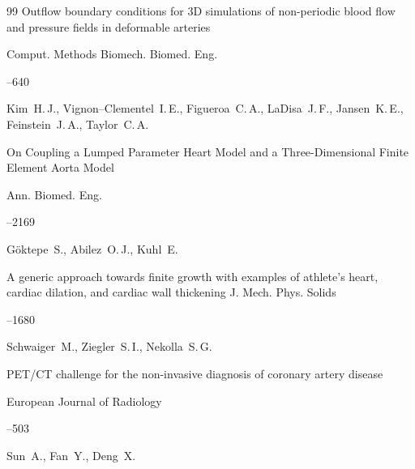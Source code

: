 \begin{thebibliography}{99}
\paper Outflow boundary conditions for 3D simulations of non-periodic blood flow and pressure fields in deformable arteries

\jour Comput. Methods Biomech. Biomed. Eng.




--640








\by Kim~H.\,J., Vignon--Clementel~I.\,E., Figueroa~C.\,A., LaDisa~J.\,F., Jansen~K.\,E., Feinstein~J.\,A., Taylor~C.\,A.

\paper On Coupling a Lumped Parameter Heart Model and a Three-Dimensional Finite Element Aorta Model 

\jour Ann. Biomed. Eng. 



--2169







\by  G\"oktepe~S., Abilez~O.\,J., Kuhl~E.

\paper  A generic approach towards finite growth with examples of athlete's heart, cardiac dilation, and cardiac wall thickening \jour J. Mech. Phys. Solids




--1680




\by Schwaiger~M., Ziegler~S.\,I., Nekolla~S.\,G.

\paper PET/CT challenge for the non-invasive diagnosis of coronary artery disease

\jour European Journal of Radiology




--503




\by Sun~A., Fan~Y., Deng~X.


\end{thebibliography}
